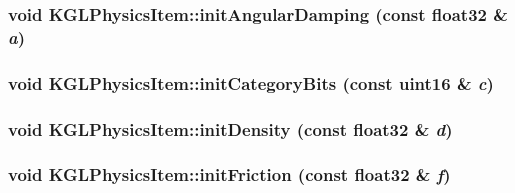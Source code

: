 \begin{CompactItemize}
\hypertarget{class_k_g_l_physics_item_7041239eb6f4eaba7a921009d0fcdcf6}{
\subsubsection[{initAngularDamping}]{\setlength{\rightskip}{0pt plus 5cm}void KGLPhysicsItem::initAngularDamping (const float32 \& {\em a})}}
\label{class_k_g_l_physics_item_7041239eb6f4eaba7a921009d0fcdcf6}


\hypertarget{class_k_g_l_physics_item_3b9673bad884214365837e3f87c35358}{
\subsubsection[{initCategoryBits}]{\setlength{\rightskip}{0pt plus 5cm}void KGLPhysicsItem::initCategoryBits (const uint16 \& {\em c})}}
\label{class_k_g_l_physics_item_3b9673bad884214365837e3f87c35358}


\hypertarget{class_k_g_l_physics_item_2a19b0749cfc745ad7ac0b6366185f41}{
\subsubsection[{initDensity}]{\setlength{\rightskip}{0pt plus 5cm}void KGLPhysicsItem::initDensity (const float32 \& {\em d})}}
\label{class_k_g_l_physics_item_2a19b0749cfc745ad7ac0b6366185f41}


\hypertarget{class_k_g_l_physics_item_7523dc0a9453bd982a4f60d1734af46f}{
\subsubsection[{initFriction}]{\setlength{\rightskip}{0pt plus 5cm}void KGLPhysicsItem::initFriction (const float32 \& {\em f})}}
\label{class_k_g_l_physics_item_7523dc0a9453bd982a4f60d1734af46f}



\end{CompactItemize}
